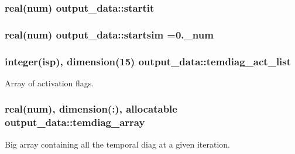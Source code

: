 \subsubsection[{\texorpdfstring{startit}{startit}}]{\setlength{\rightskip}{0pt plus 5cm}real(num) output\+\_\+data\+::startit}\hypertarget{namespaceoutput__data_a41d55c93b7330583e6a58d151f8d187b}{}\label{namespaceoutput__data_a41d55c93b7330583e6a58d151f8d187b}
\subsubsection[{\texorpdfstring{startsim}{startsim}}]{\setlength{\rightskip}{0pt plus 5cm}real(num) output\+\_\+data\+::startsim =0.\+\_\+num}\hypertarget{namespaceoutput__data_a3eebf5510f6656fe8385302d2aba28d5}{}\label{namespaceoutput__data_a3eebf5510f6656fe8385302d2aba28d5}
\subsubsection[{\texorpdfstring{temdiag\+\_\+act\+\_\+list}{temdiag_act_list}}]{\setlength{\rightskip}{0pt plus 5cm}integer(isp), dimension(15) output\+\_\+data\+::temdiag\+\_\+act\+\_\+list}\hypertarget{namespaceoutput__data_a8343f9b523163c47d0661619374f3455}{}\label{namespaceoutput__data_a8343f9b523163c47d0661619374f3455}


Array of activation flags. 

\subsubsection[{\texorpdfstring{temdiag\+\_\+array}{temdiag_array}}]{\setlength{\rightskip}{0pt plus 5cm}real(num), dimension(\+:), allocatable output\+\_\+data\+::temdiag\+\_\+array}\hypertarget{namespaceoutput__data_a034b19d2c3a5211b1fd96df24cd28dd1}{}\label{namespaceoutput__data_a034b19d2c3a5211b1fd96df24cd28dd1}


Big array containing all the temporal diag at a given iteration. 

